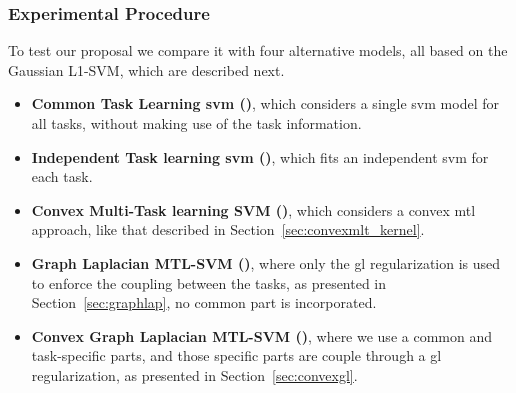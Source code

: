 %
\begin{table*}
    \caption{Sample sizes, dimensions and number of tasks of the datasets used.}
    \label{table:size_dim_tasks}
    \centering
\end{table*}


%

%

\subsubsection*{Experimental Procedure}

To test our proposal we compare it with four alternative models, all based on the Gaussian L1-SVM, which are described next.
%
\begin{itemize}
    \item \textbf{Common Task Learning \acrshort{svm} ()}, which considers a single \acrshort{svm} model for all tasks, without making use of the task information.
    \item \textbf{Independent Task learning \acrshort{svm} ()}, which fits an independent \acrshort{svm} for each task.
    \item \textbf{Convex Multi-Task learning SVM ()}, which considers a convex \acrshort{mtl} approach, like that described in Section~\ref{sec:convexmlt_kernel}.
    \item \textbf{Graph Laplacian MTL-SVM ()}, where only the \acrshort{gl} regularization is used to enforce the coupling between the tasks, as presented in Section~\ref{sec:graphlap}, no common part is incorporated.
    \item \textbf{Convex Graph Laplacian MTL-SVM ()}, where we use a common and task-specific parts, and those specific parts are couple through a \acrshort{gl} regularization, as presented in Section~\ref{sec:convexgl}.
\end{itemize}



